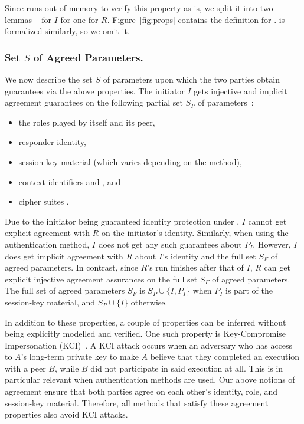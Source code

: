 Since \mTamarin{} runs out of memory to verify this property as is,
we split it into two lemmas -- \mPredImpI{} for $I$ for one \mPredImpR{} for 
$R$.
%
Figure~\ref{fig:props} contains the definition for \mPredImpI{}.
%
\mPredImpR{} is formalized similarly, so we omit it.
%

\subsubsection{Set $S$ of Agreed Parameters.}
\label{sec:agreedParams}
We now describe the set $S$ of parameters upon which the two parties obtain
guarantees via the above properties.
%
The initiator $I$ gets injective and implicit agreement guarantees on the
following partial set $S_P$ of parameters~\cite{Norr21}:
\begin{itemize}
    \item the roles played by itself and its peer,
    \item responder identity,
    \item session-key material (which varies depending on the \mEdhoc{} 
method),
    \item context identifiers \mCi{} and \mCr{}, and
    \item cipher suites \mSuites{}.
\end{itemize}
%

Due to the initiator being guaranteed identity protection under \mEdhoc{}, $I$
cannot get explicit agreement with $R$ on the initiator's identity.
%
Similarly, when using the \mStat{} authentication method, $I$ does not get 
any
such guarantees about $P_{I}$.
%
However, $I$ does get implicit agreement with $R$ about $I$'s identity and the
full set $S_{F}$ of agreed parameters.
%
In contrast, since $R$'s run finishes after that of $I$, $R$ can get explicit
injective agreement assurances on the full set $S_{F}$ of agreed parameters.
%
The full set of agreed parameters $S_F$ is $S_P \cup \{I, P_I\}$ when $P_I$
is part of the session-key material, and $S_P \cup \{I\}$ otherwise.
%

In addition to these properties, a couple of properties can be inferred
without being explicitly modelled and verified.
%
One such property is Key-Compromise Impersonation
(KCI)~\cite{DBLP:conf/ima/Blake-WilsonJM97}.
%
A KCI attack occurs when an adversary who has access to $A$'s long-term 
private
key to make $A$ believe that they completed an execution with a peer $B$,
while $B$ did not participate in said execution at all.
%
This is in particular relevant when \mStat{} authentication methods are used.
%
Our above notions of agreement ensure that both parties agree on each
other's identity, role, and session-key material.
%
Therefore, all \mEdhoc{} methods that satisfy these agreement properties also
avoid KCI attacks.
%

